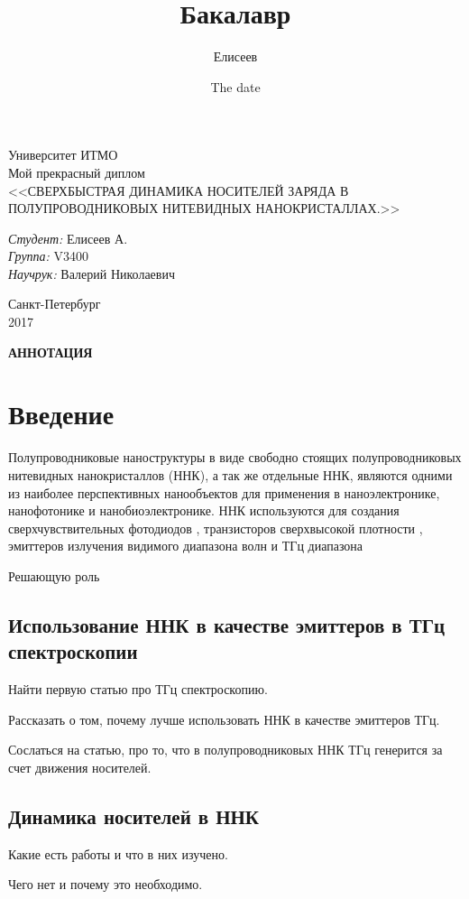 \documentclass[a4paper,14pt,russian]{extreport}
\title{Бакалавр}
\author{Елисеев}
\date{The date}
\newcommand{\empline}{\mbox{}\newline}
\newcommand{\likechapterheading}[1]{ 
    \begin{center}
    \textbf{\MakeUppercase{#1}}
    \end{center}
    \empline}
\newcommand{\likechapter}[1]{    
    \likechapterheading{#1}    
    \addcontentsline{toc}{likechapter}{\MakeUppercase{#1}}}
\begin{document}
	\def\contentsname{СОДЕРЖАНИЕ}
	\begin{titlepage}
		\begin{center}
			\large Университет ИТМО\\[2cm]
			\huge Мой прекрасный диплом\\
			\large <<СВЕРХБЫСТРАЯ ДИНАМИКА НОСИТЕЛЕЙ ЗАРЯДА В ПОЛУПРОВОДНИКОВЫХ НИТЕВИДНЫХ НАНОКРИСТАЛЛАХ.>>\\[3cm]
			\begin{flushleft}
				\emph{Студент:} Елисеев А.\\
				\emph{Группа:} V3400\\
				\emph{Научрук:} Валерий Николаевич\\
			\end{flushleft}
			\vfill
			\large Санкт-Петербург\\
			\large 2017
		\end{center}
		\thispagestyle{empty} %
	\end{titlepage}
	\setcounter{page}{2}
	\likechapter{Аннотация}
		\newpage
	\tableofcontents
	\chapter{Введение}
		Полупроводниковые наноструктуры в виде свободно стоящих
полупроводниковых нитевидных нанокристаллов (ННК), а так же отдельные ННК, являются одними из наиболее перспективных нанообъектов для применения в наноэлектронике,
нанофотонике и нанобиоэлектронике. ННК используются для создания
сверхчувствительных фотодиодов \cite{semicondNNW2006}, транзисторов сверхвысокой плотности \cite{NNWtransistors}, эмиттеров излучения видимого диапазона волн \cite{singleNNWlaser} и ТГц диапазона \cite{THzGeneration}\par
Решающую роль 
		\section{Использование ННК в качестве эмиттеров в ТГц спектроскопии}
			Найти первую статью про ТГц спектроскопию.\par
			Рассказать о том, почему лучше использовать ННК в качестве эмиттеров ТГц.\par
			Сослаться на статью, про то, что в полупроводниковых ННК ТГц генерится за счет движения носителей.
		\section{Динамика носителей в ННК}
			Какие есть работы и что в них изучено.\par
			Чего нет и почему это необходимо.
\end{document}
